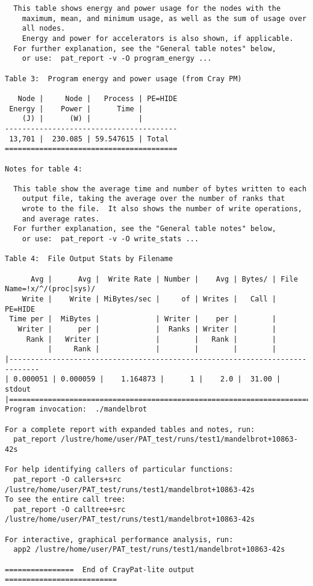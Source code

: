 \begin{verbatim}
  This table shows energy and power usage for the nodes with the
    maximum, mean, and minimum usage, as well as the sum of usage over
    all nodes.
    Energy and power for accelerators is also shown, if applicable.
  For further explanation, see the "General table notes" below,
    or use:  pat_report -v -O program_energy ...

Table 3:  Program energy and power usage (from Cray PM)

   Node |     Node |   Process | PE=HIDE
 Energy |    Power |      Time | 
    (J) |      (W) |           | 
----------------------------------------
 13,701 |  230.085 | 59.547615 | Total
========================================

Notes for table 4:

  This table show the average time and number of bytes written to each
    output file, taking the average over the number of ranks that
    wrote to the file.  It also shows the number of write operations,
    and average rates.
  For further explanation, see the "General table notes" below,
    or use:  pat_report -v -O write_stats ...

Table 4:  File Output Stats by Filename

      Avg |      Avg |  Write Rate | Number |    Avg | Bytes/ | File Name=!x/^/(proc|sys)/
    Write |    Write | MiBytes/sec |     of | Writes |   Call |  PE=HIDE
 Time per |  MiBytes |             | Writer |    per |        | 
   Writer |      per |             |  Ranks | Writer |        | 
     Rank |   Writer |             |        |   Rank |        | 
          |     Rank |             |        |        |        | 
|-----------------------------------------------------------------------------
| 0.000051 | 0.000059 |    1.164873 |      1 |    2.0 |  31.00 | stdout
|=============================================================================
Program invocation:  ./mandelbrot

For a complete report with expanded tables and notes, run:
  pat_report /lustre/home/user/PAT_test/runs/test1/mandelbrot+10863-42s

For help identifying callers of particular functions:
  pat_report -O callers+src /lustre/home/user/PAT_test/runs/test1/mandelbrot+10863-42s
To see the entire call tree:
  pat_report -O calltree+src /lustre/home/user/PAT_test/runs/test1/mandelbrot+10863-42s

For interactive, graphical performance analysis, run:
  app2 /lustre/home/user/PAT_test/runs/test1/mandelbrot+10863-42s

================  End of CrayPat-lite output  ==========================
\end{verbatim}

